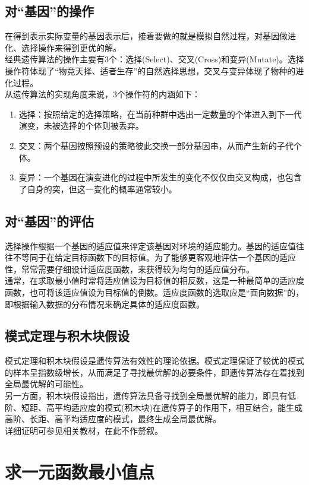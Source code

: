 \documentclass[UTF8]{ctexart}
\begin{document}
\subsection{对“基因”的操作}
在得到表示实际变量的基因表示后，接着要做的就是模拟自然过程，对基因做进化、选择操作来得到更优的解。\\
\indent 经典遗传算法的操作主要有3个：选择(Select)、交叉(Cross)和变异(Mutate)。选择操作符体现了“物竞天择、适者生存”的自然选择思想，交叉与变异体现了物种的进化过程。\\
\indent 从遗传算法的实现角度来说，3个操作符的内涵如下：
\begin{enumerate}[(1)]
\item 选择：按照给定的选择策略，在当前种群中选出一定数量的个体进入到下一代演变，未被选择的个体则被丢弃。
\item 交叉：两个基因按照预设的策略彼此交换一部分基因串，从而产生新的子代个体。
\item 变异：一个基因在演变进化的过程中所发生的变化不仅仅由交叉构成，也包含了自身的突，但这一变化的概率通常较小。
\end{enumerate}

\subsection{对“基因”的评估}
选择操作根据一个基因的适应值来评定该基因对环境的适应能力。基因的适应值往往不等同于在给定目标函数下的目标值。为了能够更客观地评估一个基因的适应性，常常需要仔细设计适应度函数，来获得较为均匀的适应值分布。\\
\indent 通常，在求取最小值时常将适应值设为目标值的相反数，这是一种最简单的适应度函数，也可将该适应值设为目标值的倒数。适应度函数的选取应是“面向数据”的，即根据输入数据的分布情况来确定具体的适应度函数。

\subsection{模式定理与积木块假设}
模式定理和积木块假设是遗传算法有效性的理论依据。模式定理保证了较优的模式的样本呈指数级增长，从而满足了寻找最优解的必要条件，即遗传算法存在着找到全局最优解的可能性。\\
\indent 另一方面，积木块假设指出，遗传算法具备寻找到全局最优解的能力，即具有低阶、短距、高平均适应度的模式(积木块)在遗传算子的作用下，相互结合，能生成高阶、长距、高平均适应度的模式，最终生成全局最优解。\\
\indent 详细证明可参见相关教材，在此不作赘叙。

\section{求一元函数最小值点}
\end{document}
